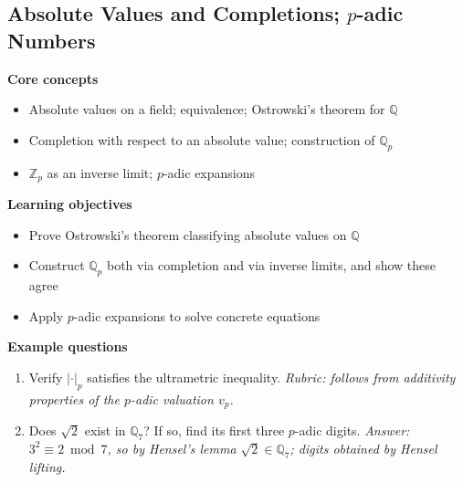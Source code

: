 \documentclass[11pt]{article}
\newcommand{\Q}{\mathbb{Q}}
\newcommand{\Qp}{\mathbb{Q}_p}
\newcommand{\Zp}{\mathbb{Z}_p}
\begin{document}
\subsection{Absolute Values and Completions; $p$-adic Numbers}
\textbf{Core concepts}
\begin{itemize}[noitemsep]
  \item Absolute values on a field; equivalence; Ostrowski's theorem for $\Q$
  \item Completion with respect to an absolute value; construction of $\Qp$
  \item $\Zp$ as an inverse limit; $p$-adic expansions
\end{itemize}
\textbf{Learning objectives}
\begin{itemize}[noitemsep]
  \item Prove Ostrowski's theorem classifying absolute values on $\Q$
  \item Construct $\Qp$ both via completion and via inverse limits, and show these agree
  \item Apply $p$-adic expansions to solve concrete equations
\end{itemize}
\textbf{Example questions}
\begin{enumerate}[noitemsep]
  \item[Q1 (foundational).] Verify $|\cdot|_p$ satisfies the ultrametric inequality. \emph{Rubric: follows from additivity properties of the $p$-adic valuation $v_p$.}
  \item[Q2 (advanced).] Does $\sqrt 2$ exist in $\Q_7$? If so, find its first three $p$-adic digits. \emph{Answer: $3^2 \equiv 2 \bmod 7$, so by Hensel's lemma $\sqrt 2 \in \Q_7$; digits obtained by Hensel lifting.}
\end{enumerate}

\end{document}
